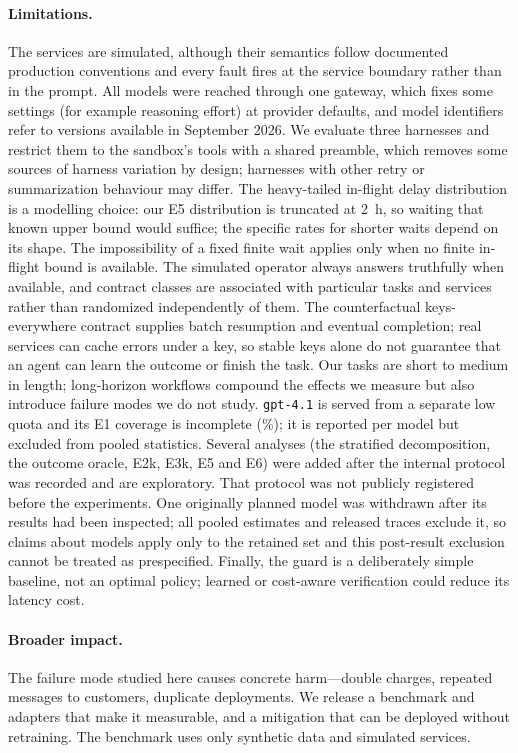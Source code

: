 \paragraph{Limitations.} The services are simulated, although their semantics follow documented production
conventions and every fault fires at the service boundary rather than in the prompt. All models were reached
through one gateway, which fixes some settings (for example reasoning effort) at provider defaults, and model
identifiers refer to versions available in September 2026. We evaluate three harnesses and restrict them to the
sandbox's tools with a shared preamble, which removes some sources of harness variation by design; harnesses with
other retry or summarization behaviour may differ. The heavy-tailed in-flight delay distribution is a modelling
choice: our E5 distribution is truncated at 2~h, so waiting that known upper bound would suffice; the
specific rates for shorter waits depend on its shape. The impossibility of a fixed finite wait applies only
when no finite in-flight bound is available. The simulated operator always answers
truthfully when available, and contract classes are associated with particular tasks and services rather than
randomized independently of them. The counterfactual keys-everywhere contract supplies batch resumption and
eventual completion; real services can cache errors under a key, so stable keys alone do not guarantee that an
agent can learn the outcome or finish the task. Our tasks are short to medium in length; long-horizon workflows compound the effects we
measure but also introduce failure modes we do not study. \texttt{gpt-4.1} is served from a separate low quota and
its E1 coverage is incomplete (\GptFourOneCoverage{}\%); it is reported per model but excluded from pooled
statistics. Several analyses (the stratified decomposition, the outcome oracle, E2k, E3k, E5 and E6) were added
after the internal protocol was recorded and are exploratory. That protocol was not publicly registered before the
experiments. One originally planned model was withdrawn after its results had been inspected; all pooled estimates
and released traces exclude it, so claims about models apply only to the retained set and this post-result
exclusion cannot be treated as prespecified. Finally, the guard is a deliberately simple baseline, not an optimal
policy; learned or cost-aware verification \citep{tang2026verify} could reduce its latency cost.

\paragraph{Broader impact.} The failure mode studied here causes concrete harm---double charges, repeated
messages to customers, duplicate deployments. We release a benchmark and adapters that make it measurable, and
a mitigation that can be deployed without retraining. The benchmark uses only synthetic data and simulated
services.

